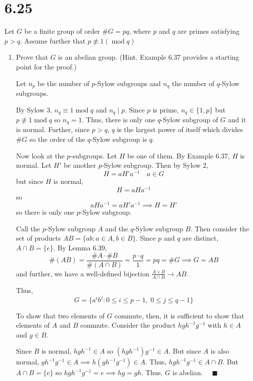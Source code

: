 \documentclass[12pt]{article}
\newcommand{\qed}{\quad \blacksquare}
\renewcommand{\mod}{\;\text{mod}\;}
\begin{document}
\section*{6.25} 
Let $G$ be a finite group of order $\#G = pq$, where $p$ and $q$ are primes satisfying $p > q$. Assume further that $p \not \equiv 1 (\mod q)$
\begin{enumerate}
    \item Prove that $G$ is an abelian group. (Hint. Example 6.37 provides a starting point for the proof.)

        \color{blue}
            Let $n_p$ be the number of $p$-Sylow subgroups and $n_q$ the number of $q$-Sylow subgroups. 
            
            By Sylow 3, $n_q \equiv 1 \mod q$ and $n_q \mid p$. Since $p$ is prime, $n_q \in \{1, p\}$ but $p \not \equiv 1 \mod q$ so $n_q = 1$. Thus, there is only one $q$-Sylow subgroup of $G$ and it is normal. Further, since $p > q$, $q$ is the largest power of itself which divides $\#G$ so the order of the $q$-Sylow subgroup is $q$. 

            Now look at the $p$-subgroups. Let $H$ be one of them. By Example 6.37, $H$ is normal. Let $H'$ be another $p$-Sylow subgroup. Then by Sylow 2, 
            \[H = aH'a^{-1} \quad a\in G\]
            but since $H$ is normal, 
            \[H= aHa^{-1}\]
            so 
            \[aHa^{-1} = aH'a^{-1} \implies H = H'\]
            so there is only one $p$-Sylow subgroup.           

            Call the $p$-Sylow subgroup $A$ and the $q$-Sylow subgroup $B$. Then consider the set of products $AB = \{ab : a \in A, b \in B\}$. Since $p$ and $q$ are distinct, $A \cap B = \{e\}$. By Lemma 6.39, 
            \[\#(AB) = \frac{\#A \cdot \#B}{\#(A \cap B)} = \frac{p \cdot q}{1} = pq = \#G \implies G = AB\]
            and further, we have a well-defined bijection $\frac{A \times B}{A \cap B} \to AB$. 

            Thus, 
            \[G = \{a^i b^j : 0 \leq i \leq p - 1, \; 0 \leq j \leq q - 1\}\]
           
            To show that two elements of $G$ commute, then, it is sufficient to show that elements of $A$ and $B$ commute. Consider the product $hgh^{-1}g^{-1}$ with $h \in A$ and $g \in B$.

            Since $B$ is normal, $hgh^{-1} \in A$ so $(hgh^{-1})g^{-1} \in A$. But since $A$ is also normal, $gh^{-1}g^{-1} \in A \implies h(gh^{-1}g^{-1}) \in A$. Thus, $hgh^{-1}g^{-1} \in A \cap B$. But $A \cap B = \{e\}$ so $hgh^{-1}g^{-1} = e \implies hg = gh$. Thus, $G$ is abelian. $\qed$


\end{enumerate}
\end{document}
